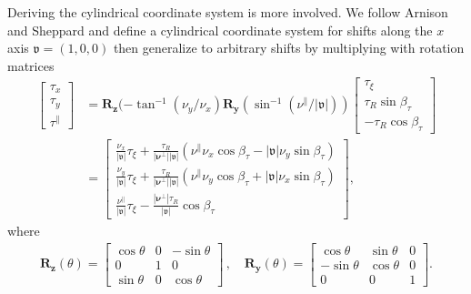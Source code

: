 \documentclass[]{osa-article}
\providecommand{\mb}[1]{\mathbf{#1}}
\newcommand{\mypar}{\parallel}
\providecommand{\bs}[1]{\boldsymbol{#1}}
\providecommand{\bv}{\boldsymbol{\mathfrak{v}}}
\providecommand{\bvperp}{\bs{\nu}^{\bot}}
\providecommand{\bvpar}{\nu^{\parallel}}
\providecommand{\btpar}{\tau^{\mypar}}
\begin{document}
Deriving the cylindrical coordinate system is more involved. We follow Arnison and Sheppard \cite{arnison2002} and define a cylindrical coordinate system for shifts along the $x$ axis $\bv = (1,0,0)$ then generalize to arbitrary shifts by multiplying with rotation matrices
\begin{align}
  \begin{bmatrix}
    \tau_x\\
    \tau_y\\
    \btpar
  \end{bmatrix}
  &= \mb{R}_{\mb{z}}(-\tan^{-1}(\nu_y/\nu_x)\mb{R}_{\mb{y}}(\sin^{-1}(\bvpar/|\bv|))
  \begin{bmatrix}
    \tau_\xi\\
    \tau_R\sin\beta_\tau\\
    -\tau_R\cos\beta_\tau
  \end{bmatrix}\nonumber\\
  &=
  \begin{bmatrix}
    \displaystyle\frac{\nu_x}{|\bv|}\tau_\xi + \frac{\tau_R}{|\bvperp||\bv|}(\bvpar\nu_x\cos\beta_\tau - |\bv|\nu_y\sin\beta_\tau)\\[1em]
    \displaystyle\frac{\nu_y}{|\bv|}\tau_\xi + \frac{\tau_R}{|\bvperp||\bv|}(\bvpar\nu_y\cos\beta_\tau + |\bv|\nu_x\sin\beta_\tau)\\[1em]
    \displaystyle\frac{\bvpar}{|\bv|}\tau_\xi - \frac{|\bvperp|\tau_R}{|\bv|}\cos\beta_\tau
  \end{bmatrix},\label{eq:cylindrical}
\end{align}
where
\begin{align}
  \mb{R}_\mb{z}(\theta) =
  \begin{bmatrix}
    \cos\theta & 0 & -\sin\theta\\
    0 & 1 & 0\\
    \sin\theta & 0 &\cos\theta
  \end{bmatrix}\, ,\quad 
  \mb{R}_\mb{y}(\theta) =
  \begin{bmatrix}
    \cos\theta & \sin\theta & 0\\
    -\sin\theta & \cos\theta & 0\\
    0 & 0 & 1
  \end{bmatrix}.
\end{align}
\end{document}
